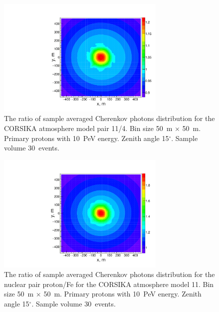 \documentclass[universe,article,accept,moreauthors,pdftex]{Definitions/mdpi}
\begin{document}
\begin{figure}[H]
        \includegraphics[width=19pc]{10PeV_pro_15deg_m11_over_m04=}
        \caption{The ratio of sample averaged Cherenkov photons distribution for the CORSIKA atmosphere model pair 11/4. Bin size 50~m $\times$ 50~m. Primary protons with 10~PeV energy. Zenith angle 15$^\circ$. Sample volume 30~events.}
        \label{fig:4d11}
        \end{figure}
        \unskip
\begin{figure}[H]
        \includegraphics[width=19pc]{10PeV_15deg_pro_over_Fe=}
        \caption{The ratio of sample averaged Cherenkov photons distribution for the nuclear pair proton/Fe for the CORSIKA atmosphere model 11. Bin size 50~m $\times$ 50~m. Primary protons with 10~PeV energy. Zenith angle 15$^\circ$. Sample volume 30~events.}
        \label{fig:pdFe}
\end{figure}
\end{document}
